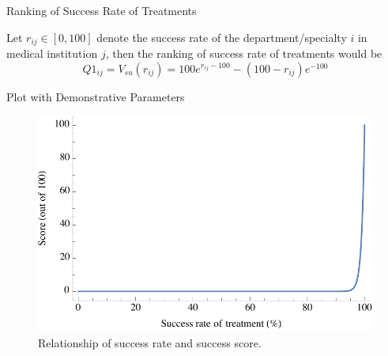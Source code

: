\documentclass[8pt, hyperref={colorlinks=true}]{beamer}
\begin{document}
\begin{frame}{Ranking of Success Rate of Treatments}

\begin{definition}
Let $r_{ij}\in[0,100]$ denote the success rate of the department/specialty $i$ in medical institution $j$, then the ranking of success rate of treatments would be
\[
Q1_{ij}=V_{su}\left(r_{ij}\right) = 100 e^{r_{ij}-100} - (100-r_{ij})e^{-100}
\]
\end{definition}
\begin{block}{Plot with Demonstrative Parameters}
\begin{figure}
    \centering
    \includegraphics[scale=0.425]{success_rate.pdf}
    \caption{Relationship of success rate and success score.}
    \label{fig:success_rate}
\end{figure}
\end{block}
\end{frame}
\end{document}
